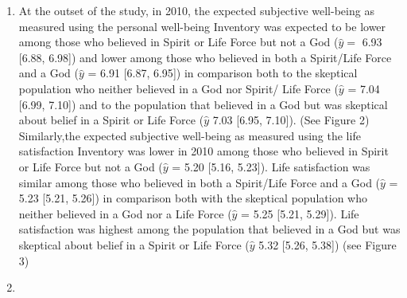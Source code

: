 \documentclass[
  english,
  man,floatsintext]{apa6}
\begin{document}
\begin{enumerate}
\def\labelenumi{\arabic{enumi}.}
\item
  At the outset of the study, in 2010, the expected subjective well-being as measured using the personal well-being Inventory was expected to be lower among those who believed in Spirit or Life Force but not a God (\(\hat{y} =\) 6.93 \textbar{} {[}6.88, 6.98{]}) and lower among those who believed in both a Spirit/Life Force and a God (\(\hat{y}\) = 6.91 \textbar{} {[}6.87, 6.95{]}) in comparison both to the skeptical population who neither believed in a God nor Spirit/ Life Force (\(\hat{y}\) = 7.04 \textbar{} {[}6.99, 7.10{]}) and to the population that believed in a God but was skeptical about belief in a Spirit or Life Force (\(\hat{y}\) 7.03 \textbar{} {[}6.95, 7.10{]}). (See Figure 2) Similarly,the expected subjective well-being as measured using the life satisfaction Inventory was lower in 2010 among those who believed in Spirit or Life Force but not a God (\(\hat{y}\) = 5.20 \textbar{} {[}5.16, 5.23{]}). Life satisfaction was similar among those who believed in both a Spirit/Life Force and a God (\(\hat{y}\) = 5.23 \textbar{} {[}5.21, 5.26{]}) in comparison both with the skeptical population who neither believed in a God nor a Life Force (\(\hat{y}\) = 5.25 \textbar{} {[}5.21, 5.29{]}). Life satisfaction was highest among the population that believed in a God but was skeptical about belief in a Spirit or Life Force (\(\hat{y}\) 5.32 \textbar{} {[}5.26, 5.38{]}) (see Figure 3)
\item

\end{enumerate}
\end{document}
